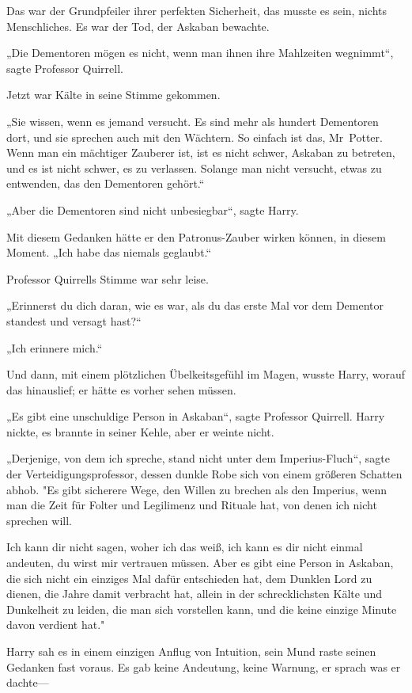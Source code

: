 {Das war der Grundpfeiler ihrer perfekten Sicherheit, das musste es sein, nichts Menschliches. Es war der Tod, der Askaban bewachte.

„Die Dementoren mögen es nicht, wenn man ihnen ihre Mahlzeiten wegnimmt“, sagte Professor Quirrell.

Jetzt war Kälte in seine Stimme gekommen.

„Sie wissen, wenn es jemand versucht. Es sind mehr als hundert Dementoren dort, und sie sprechen auch mit den Wächtern. So einfach ist das, Mr~Potter. Wenn man ein mächtiger Zauberer ist, ist es nicht schwer, Askaban zu betreten, und es ist nicht schwer, es zu verlassen. Solange man nicht versucht, etwas zu entwenden, das den Dementoren gehört.“

„Aber die Dementoren sind nicht unbesiegbar“, sagte Harry.

Mit diesem Gedanken hätte er den Patronus-Zauber wirken können, in diesem Moment. „Ich habe das niemals geglaubt.“

Professor Quirrells Stimme war sehr leise.

„Erinnerst du dich daran, wie es war, als du das erste Mal vor dem Dementor standest und versagt hast?“

„Ich erinnere mich.“

Und dann, mit einem plötzlichen Übelkeitsgefühl im Magen, wusste Harry, worauf das hinauslief; er hätte es vorher sehen müssen.

„Es gibt eine unschuldige Person in Askaban“, sagte Professor Quirrell. Harry nickte, es brannte in seiner Kehle, aber er weinte nicht.

„Derjenige, von dem ich spreche, stand nicht unter dem Imperius-Fluch“, sagte der Verteidigungsprofessor, dessen dunkle Robe sich von einem größeren Schatten abhob. "Es gibt sicherere Wege, den Willen zu brechen als den Imperius, wenn man die Zeit für Folter und Legilimenz und Rituale hat, von denen ich nicht sprechen will.

Ich kann dir nicht sagen, woher ich das weiß, ich kann es dir nicht einmal andeuten, du wirst mir vertrauen müssen. Aber es gibt eine Person in Askaban, die sich nicht ein einziges Mal dafür entschieden hat, dem Dunklen Lord zu dienen, die Jahre damit verbracht hat, allein in der schrecklichsten Kälte und Dunkelheit zu leiden, die man sich vorstellen kann, und die keine einzige Minute davon verdient hat."

Harry sah es in einem einzigen Anflug von Intuition, sein Mund raste seinen Gedanken fast voraus. Es gab keine Andeutung, keine Warnung, er sprach was er dachte—

}

